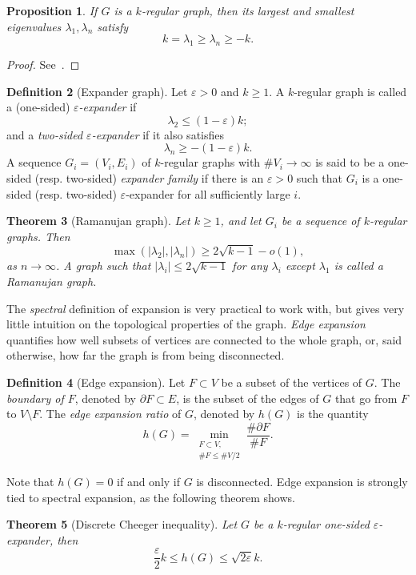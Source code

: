 \documentclass[10pt]{article}
\theoremstyle{plain}
\newtheorem{theorem}{Theorem}
\newtheorem{proposition}[theorem]{Proposition}
\theoremstyle{definition}
\newtheorem{definition}[theorem]{Definition}
\begin{document}
\begin{proposition}
  \label{th:graph-eigen}
  If $G$ is a $k$-regular graph, then its largest and smallest
  eigenvalues $λ_1,λ_n$ satisfy
  \[k=λ_1≥λ_n≥-k.\]
\end{proposition}
\begin{proof}
  See~\cite[Lem.~2]{tao2011expander}.
\end{proof}

\begin{definition}[Expander graph]
  Let $ε>0$ and $k≥1$. A $k$-regular graph is called a (one-sided)
  \emph{$ε$-expander} if
  \[λ_2≤(1-ε)k;\]
  and a \emph{two-sided $ε$-expander} if it also satisfies
  \[λ_n≥-(1-ε)k.\] %
  A sequence $G_i=(V_i,E_i)$ of $k$-regular graphs with $\#V_i\to∞$ is
  said to be a one-sided (resp. two-sided) \emph{expander family} if
  there is an $ε>0$ such that $G_i$ is a one-sided (resp. two-sided)
  $ε$-expander for all sufficiently large $i$.
\end{definition}

\begin{theorem}[Ramanujan graph]
  Let $k≥1$, and let $G_i$ be a sequence of $k$-regular graphs. %
  Then
  \[\max(|λ_2|,|λ_n|) ≥ 2\sqrt{k-1} - o(1),\]
  as $n\to ∞$. %
  A graph such that $|λ_i|≤2\sqrt{k-1}$ for any $λ_i$ except $λ_1$ is
  called a \emph{Ramanujan graph}.
\end{theorem}

The \emph{spectral} definition of expansion is very practical to work
with, but gives very little intuition on the topological properties of
the graph. %
\emph{Edge expansion} quantifies how well subsets of vertices are
connected to the whole graph, or, said otherwise, how far the graph is
from being disconnected.

\begin{definition}[Edge expansion]
  Let $F⊂V$ be a subset of the vertices of $G$. %
  The \emph{boundary of $F$}, denoted by $∂F⊂E$, is the subset of the
  edges of $G$ that go from $F$ to $V\setminus F$. %
  The \emph{edge expansion ratio} of $G$, denoted by $h(G)$ is the
  quantity
  \[h(G) = \min_{\substack{F⊂V,\\ \#F≤\#V/2}}\frac{\#∂F}{\#F}.\]
\end{definition}

Note that $h(G)=0$ if and only if $G$ is disconnected. %
Edge expansion is strongly tied to spectral expansion, as the
following theorem shows.

\begin{theorem}[Discrete Cheeger inequality]
  Let $G$ be a $k$-regular one-sided $ε$-expander, then
  \[\frac{ε}{2}k≤h(G)≤\sqrt{2ε}k.\]
\end{theorem}
\end{document}
